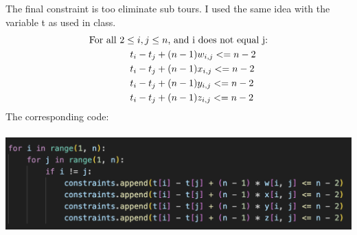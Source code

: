 \documentclass[12pt]{extarticle}
\begin{document}
The final constraint is too eliminate sub tours. I used the same idea with the variable t as used in class.
\begin{align*}
&\text{For all } 2 \leq i, j \leq n \text{, and i does not equal j:} \\
&\hspace{1.5cm}t_i - t_j + (n-1)w_{i,j} <= n-2 \\
&\hspace{1.5cm}t_i - t_j + (n-1)x_{i,j} <= n-2 \\
&\hspace{1.5cm}t_i - t_j + (n-1)y_{i,j} <= n-2 \\
&\hspace{1.5cm}t_i - t_j + (n-1)z_{i,j} <= n-2 \\
\end{align*}
The corresponding code: \\ \\
\includegraphics[scale = .5]{images/constraints6.png} \\
\end{document}
